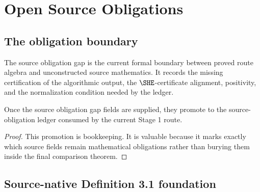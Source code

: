 \chapter{Open Source Obligations}
\label{ch:source-obligations}

\section{The obligation boundary}

\begin{definition}
  \label{def:source-obligation-gap}
  \leanok
  The source obligation gap is the current formal boundary between proved
  route algebra and unconstructed source mathematics.  It records the missing
  certification of the algorithmic output, the \(\SHE\)-certificate alignment,
  \qPilot{} positivity, and the normalization condition needed by the ledger.
\end{definition}

\begin{proposition}
  \label{prop:gap-promotion-formal}
  \leanok
  Once the source obligation gap fields are supplied, they promote to the
  source-obligation ledger consumed by the current Stage 1 route.
\end{proposition}

\begin{proof}
  This promotion is bookkeeping.  It is valuable because it marks exactly which
  source fields remain mathematical obligations rather than burying them inside
  the final comparison theorem.
\end{proof}

\section{Source-native Definition 3.1 foundation}

